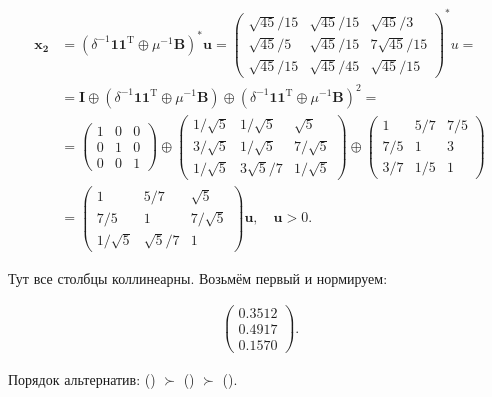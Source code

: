 \documentclass[specialist,
	substylefile = spbu_report.rtx,
	subf,href,colorlinks=true, 12pt]{disser}
\begin{document}
\begin{align*}
	\boldsymbol{x_2} & = (\delta^{-1}\boldsymbol{1}\boldsymbol{1}^\mathrm{T} \oplus \mu^{-1}\boldsymbol{B})^*\boldsymbol{u} = \begin{pmatrix}\sqrt{45}/15 & \sqrt{45}/15 & \sqrt{45}/3\\ \sqrt{45}/5 & \sqrt{45}/15 & 7\sqrt{45}/15 \\ \sqrt{45}/15 & \sqrt{45}/45 & \sqrt{45}/15 \end{pmatrix}^*u =                   \\
	                 & = \boldsymbol{I} \oplus (\delta^{-1}\boldsymbol{1}\boldsymbol{1}^\mathrm{T} \oplus \mu^{-1}\boldsymbol{B}) \oplus (\delta^{-1}\boldsymbol{1}\boldsymbol{1}^\mathrm{T} \oplus \mu^{-1}\boldsymbol{B})^2 = \\
	                 & = \begin{pmatrix} 1&0&0 \\ 0&1&0 \\ 0&0&1 \end{pmatrix}
	\oplus
	\begin{pmatrix}1/\sqrt{5}&1/\sqrt{5}&\sqrt{5}\\3/\sqrt{5}&1/\sqrt{5}&7/\sqrt{5}\\1/\sqrt{5}&3\sqrt{5}/7&1/\sqrt{5}\end{pmatrix}
	\oplus
	\begin{pmatrix}1&5/7&7/5\\7/5&1&3\\3/7&1/5&1\end{pmatrix}                                                                                     \\
	                 & = \begin{pmatrix} 1&5/7&\sqrt{5}\\ 7/5&1&7/\sqrt{5}\\ 1/\sqrt{5}&\sqrt{5}/7&1 \end{pmatrix}\boldsymbol{u}, \quad \boldsymbol{u} > 0.
\end{align*}

Тут все столбцы коллинеарны. Возьмём первый и нормируем:

\begin{align*}
	\begin{pmatrix}0.3512\\0.4917\\0.1570\end{pmatrix}.
\end{align*}

Порядок альтернатив: () \(\succ\) () \(\succ\) ().
\end{document}

